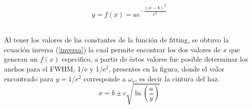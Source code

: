 \documentclass[11pt,letterpaper,twocolumn]{article}
\begin{document}
\begin{equation}
y=f(x)=a e^{- \dfrac{(x-b)^{2}}{c^{2}}}
\label{fit}
\end{equation}
\\
\par 
Al tener los valores de las constantes de la función de fitting, se obtuvo la ecuación inversa (\ref{inversa}) la cual permite encontrar los dos valores de $x$ que generan un $f(x)$ especifico, a partir de éstos valores fue posible determinar los anchos para el FWHM, 1/e y 1/e$^{2}$, presentes en la figura, donde el valor encontrado para $y=1/e^{2}$ corresponde a $\omega_{o}$, es decir la cintura del haz.\\
\begin{equation}
x=b \pm c \sqrt{\ln(\dfrac{a}{y})}
\label{inversa}
\end{equation}
\end{document}
